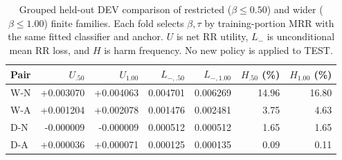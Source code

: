 \begin{table}[htbp]
\centering\footnotesize
\setlength{\tabcolsep}{3.5pt}
\caption{Grouped held-out DEV comparison of restricted ($\beta\leq0.50$) and wider ($\beta\leq1.00$) finite families. Each fold selects $\beta,\tau$ by training-portion MRR with the same fitted classifier and anchor. $U$ is net RR utility, $L_-$ is unconditional mean RR loss, and $H$ is harm frequency. No new policy is applied to TEST.}
\label{tab:conservative-dev}
\begin{tabular}{lrrrrrr}
\toprule
Pair & $U_{.50}$ & $U_{1.00}$ & $L_{-,.50}$ & $L_{-,1.00}$ & $H_{.50}$ (\%) & $H_{1.00}$ (\%)\\
\midrule
W-N & +0.003070 & +0.004063 & 0.004701 & 0.006269 & 14.96 & 16.80\\
W-A & +0.001204 & +0.002078 & 0.001476 & 0.002481 & 3.75 & 4.63\\
D-N & -0.000009 & -0.000009 & 0.000512 & 0.000512 & 1.65 & 1.65\\
D-A & +0.000036 & +0.000071 & 0.000125 & 0.000135 & 0.09 & 0.11\\
\bottomrule
\end{tabular}
\end{table}
